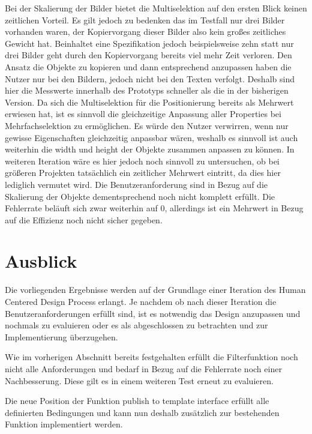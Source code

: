 Bei der Skalierung der Bilder bietet die Multiselektion auf den ersten Blick keinen zeitlichen Vorteil.
Es gilt jedoch zu bedenken das im Testfall nur drei Bilder vorhanden waren, der Kopiervorgang dieser Bilder also kein großes zeitliches Gewicht hat.
Beinhaltet eine Spezifikation jedoch beispielsweise zehn statt nur drei Bilder geht durch den Kopiervorgang bereits viel mehr Zeit verloren.
Den Ansatz die Objekte zu kopieren und dann entsprechend anzupassen haben die Nutzer nur bei den Bildern, jedoch nicht bei den Texten verfolgt.
Deshalb sind hier die Messwerte innerhalb des Prototyps schneller als die in der bisherigen Version.
Da sich die Multiselektion für die Positionierung bereits als Mehrwert erwiesen hat, ist es sinnvoll die gleichzeitige Anpassung aller Properties bei Mehrfachselektion zu ermöglichen.
Es würde den Nutzer verwirren, wenn nur gewisse Eigenschaften gleichzeitig anpassbar wären, weshalb es sinnvoll ist auch weiterhin die width und height der Objekte zusammen anpassen zu können.
In weiteren Iteration wäre es hier jedoch noch sinnvoll zu untersuchen, ob bei größeren Projekten tatsächlich ein zeitlicher Mehrwert eintritt, da dies hier lediglich vermutet wird.
Die Benutzeranforderung sind in Bezug auf die Skalierung der Objekte dementsprechend noch nicht komplett erfüllt.
Die Fehlerrate beläuft sich zwar weiterhin auf 0, allerdings ist ein Mehrwert in Bezug auf die Effizienz noch nicht sicher gegeben.

\section {Ausblick}
Die vorliegenden Ergebnisse werden auf der Grundlage einer Iteration des Human Centered Design Process erlangt.
Je nachdem ob nach dieser Iteration die Benutzeranforderungen erfüllt sind, ist es notwendig das Design anzupassen und nochmals zu evaluieren oder es als abgeschlossen zu betrachten und zur Implementierung überzugehen.

Wie im vorherigen Abschnitt bereits festgehalten erfüllt die Filterfunktion noch nicht alle Anforderungen und bedarf in Bezug auf die Fehlerrate noch einer Nachbesserung.
Diese gilt es in einem weiteren Test erneut zu evaluieren.

Die neue Position der Funktion \glqq publish to template interface\grqq{} erfüllt alle definierten Bedingungen und kann nun deshalb zusätzlich zur bestehenden Funktion implementiert werden.

